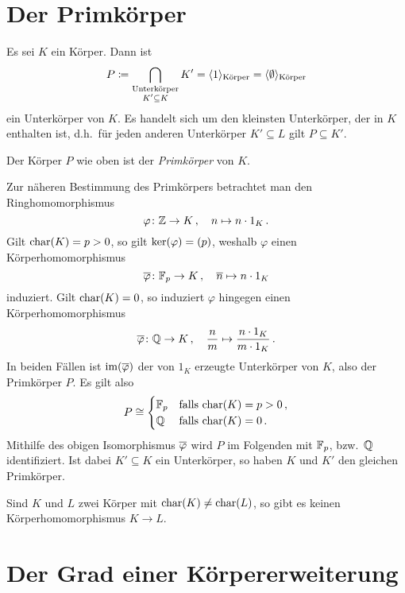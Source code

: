 \section{Der Primkörper}

Es sei $K$ ein Körper.
Dann ist
\[
            P
  \coloneqq  \bigcap_{\substack{\text{Unterkörper} \\ K' \subseteq K}} K'
  =         \langle1\rangle_{\text{Körper}}
  =         \langle\emptyset\rangle_{\text{Körper}}
\]
ein Unterkörper von $K$.
Es handelt sich um den kleinsten Unterkörper, der in $K$ enthalten ist, d.h.\ für jeden anderen Unterkörper $K' \subseteq L$ gilt $P \subseteq K'$.

\begin{definition}
  Der Körper $P$ wie oben ist der \emph{Primkörper} von $K$.
\end{definition}

Zur näheren Bestimmung des Primkörpers betrachtet man den Ringhomomorphismus
\[
          \varphi
  \colon  \mathbb{Z}
  \to     K \,,
  \quad   n
  \mapsto n \cdot 1_K \,.
\]
Gilt $\operatorname{char}(K) = p > 0$, so gilt $\ker(\varphi) = (p)$, weshalb $\varphi$ einen Körperhomomorphismus
\[
          \overline{\varphi}
  \colon  \mathbb{F}_p
  \to     K \,,
  \quad   \overline{n}
  \mapsto n \cdot 1_K
\]
induziert.
Gilt $\operatorname{char}(K) = 0$, so induziert $\varphi$ hingegen einen Körperhomomorphismus
\[
          \overline{\varphi}
  \colon  \mathbb{Q}
  \to     K \,,
  \quad   \frac{n}{m}
  \mapsto \frac{n \cdot 1_K}{m \cdot 1_K} \,.
\]
In beiden Fällen ist $\operatorname{im}(\overline{\varphi})$ der von $1_K$ erzeugte Unterkörper von $K$, also der Primkörper $P$.
Es gilt also
\[
          P
  \cong \begin{cases}
          \mathbb{F}_p & \text{falls $\operatorname{char}(K) = p > 0$} \,, \\
          \mathbb{Q} & \text{falls $\operatorname{char}(K) = 0$} \,.
        \end{cases}
\]
Mithilfe des obigen Isomorphismus $\overline{\varphi}$ wird $P$ im Folgenden mit $\mathbb{F}_p$, bzw.\ $\mathbb{Q}$ identifiziert.
Ist dabei $K' \subseteq K$ ein Unterkörper, so haben $K$ und $K'$ den gleichen Primkörper.

\begin{corollary}
  Sind $K$ und $L$ zwei Körper mit $\operatorname{char}(K) \neq \operatorname{char}(L)$, so gibt es keinen Körperhomomorphismus $K \to L$.
\end{corollary}





\section{Der Grad einer Körpererweiterung}

